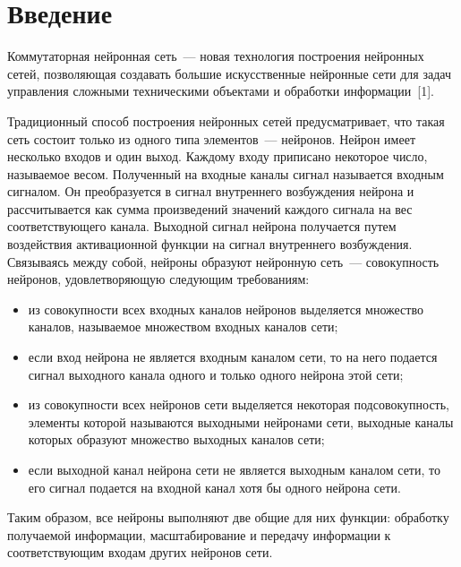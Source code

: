       \begin{multicols}{2}

      \label{st\stat}
  
\section{Введение}
     
     Коммутаторная нейронная сеть~--- новая технология построения 
нейронных сетей, позволяющая создавать большие искусственные 
нейронные сети для задач управления сложными техническими объектами и 
обработки информации~[1].
     
     Традиционный способ построения нейронных сетей предусматривает, 
что такая сеть состоит только из одного типа элементов~--- нейронов. 
Нейрон имеет  несколько входов и один выход. Каждому входу приписано 
некоторое число, называемое весом. Полученный на входные каналы сигнал 
называется входным сигналом. Он преобразуется в сигнал внут\-рен\-не\-го 
возбуждения нейрона и рассчитывается как сумма произведений значений 
каждого сигнала на вес соответствующего канала. Выходной сигнал нейрона 
получается путем воздействия активационной функции на сигнал 
внут\-рен\-не\-го возбуждения. Связываясь между собой, нейроны образуют 
нейронную сеть~--- совокупность нейронов, удовлетворяющую следующим 
требованиям: 
     \begin{itemize}
     \item  из совокупности всех входных каналов нейронов выделяется 
множество каналов, на\-зы\-ва\-емое множеством входных каналов сети; 
     \item если вход нейрона не является входным каналом сети, то на него 
подается сигнал выходного канала одного и только одного нейрона этой 
сети; 
     \item из совокупности всех нейронов сети выделяется некоторая 
подсовокупность, элементы которой называются выходными нейронами 
сети, выходные каналы которых образуют множество выходных каналов 
сети; 
     \item если выходной канал нейрона сети не является выходным 
каналом сети, то его сигнал подается на входной канал хотя бы одного 
нейрона сети.
     \end{itemize}
     
      Таким образом, все нейроны выполняют две общие для них функции: 
обработку получаемой информации, масштабирование и передачу 
информации к соответствующим входам других нейронов сети. 
     

\end{multicols}
